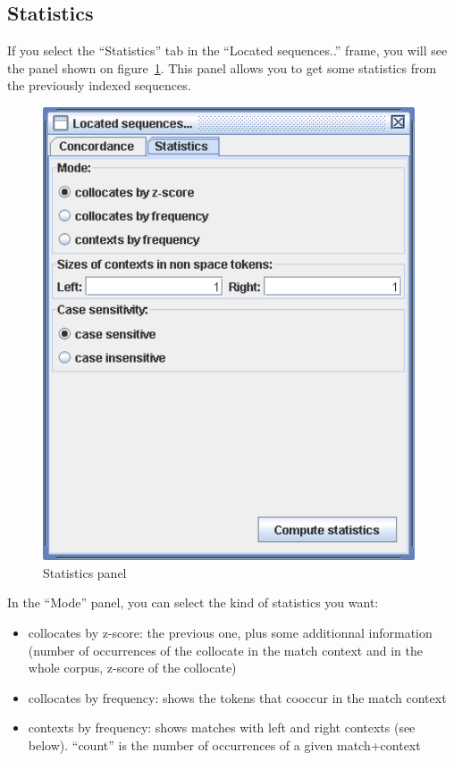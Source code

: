 \clearpage
\subsection{Statistics}
\label{section-statistics}
If you select the ``Statistics'' tab in the ``Located sequences..''
frame, you will see the panel shown on figure~\ref{fig-statistics}. This panel
allows you to get some statistics from the previously indexed sequences. 

\bigskip
\begin{figure}[!ht]
\begin{center}
\includegraphics[width=11cm]{resources/img/fig4-9.png}
\caption{Statistics panel\label{fig-statistics}}
\end{center}
\end{figure}

\bigskip
\noindent In the ``Mode'' panel, you can select the kind of statistics you want:
\begin{itemize}
  \item collocates by z-score: the previous one, plus some additionnal
  information (number of occurrences of the collocate in the match context and
  in the whole corpus, z-score of the collocate)
  \item collocates by frequency: shows the tokens that cooccur in the match
  context
  \item contexts by frequency: shows matches with left and right contexts (see
  below). ``count'' is the number of occurrences of a given match+context
\end{itemize}

